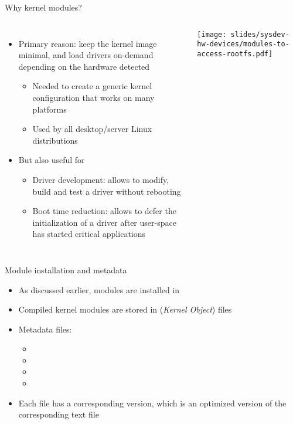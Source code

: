 \begin{frame}{Why kernel modules?}
  \begin{columns}
    \begin{itemize}
    \item Primary reason: keep the kernel image minimal, and load
      drivers on-demand depending on the hardware detected
      \begin{itemize}
      \item Needed to create a generic kernel configuration that works
        on many platforms
      \item Used by all desktop/server Linux distributions
      \end{itemize}
    \item But also useful for
      \begin{itemize}
      \item Driver development: allows to modify, build and test a
        driver without rebooting
      \item Boot time reduction: allows to defer the initialization of
        a driver after user-space has started critical applications
      \end{itemize}
    \end{itemize}
    \texttt{[image: slides/sysdev-hw-devices/modules-to-access-rootfs.pdf]}
  \end{columns}
\end{frame}

\begin{frame}{Module installation and metadata}
  \begin{itemize}
  \item As discussed earlier, modules are installed in
  \item Compiled kernel modules are stored in  ({\em Kernel Object}) files
  \item Metadata files:
    \begin{itemize}
    \item {}
    \item {}
    \item {}
    \item {}
    \end{itemize}
  \item Each file has a corresponding  version, which is an optimized version of the corresponding text file
  \end{itemize}
\end{frame}

